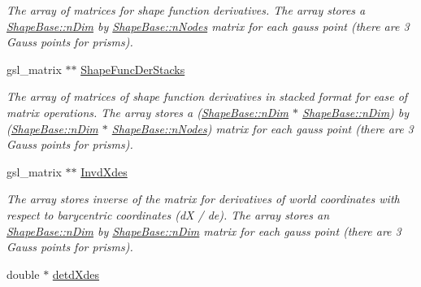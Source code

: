 \begin{DoxyCompactItemize}
\begin{DoxyCompactList}\small\item\em The array of matrices for shape function derivatives. The array stores a \hyperlink{classShapeBase_a250bd3396546342c8104f5b9c180d18f}{Shape\+Base\+::n\+Dim} by \hyperlink{classShapeBase_ae7dd93b58b3281ce90025f83d0f0e976}{Shape\+Base\+::n\+Nodes} matrix for each gauss point (there are 3 Gauss points for prisms). \end{DoxyCompactList}\item 
\hypertarget{classShapeBase_a23deaddf67b09f6fe5470f05385001fe}{}gsl\+\_\+matrix $\ast$$\ast$ \hyperlink{classShapeBase_a23deaddf67b09f6fe5470f05385001fe}{Shape\+Func\+Der\+Stacks}\label{classShapeBase_a23deaddf67b09f6fe5470f05385001fe}

\begin{DoxyCompactList}\small\item\em The array of matrices of shape function derivatives in stacked format for ease of matrix operations. The array stores a (\hyperlink{classShapeBase_a250bd3396546342c8104f5b9c180d18f}{Shape\+Base\+::n\+Dim} $\ast$ \hyperlink{classShapeBase_a250bd3396546342c8104f5b9c180d18f}{Shape\+Base\+::n\+Dim}) by (\hyperlink{classShapeBase_a250bd3396546342c8104f5b9c180d18f}{Shape\+Base\+::n\+Dim} $\ast$ \hyperlink{classShapeBase_ae7dd93b58b3281ce90025f83d0f0e976}{Shape\+Base\+::n\+Nodes}) matrix for each gauss point (there are 3 Gauss points for prisms). \end{DoxyCompactList}\item 
\hypertarget{classShapeBase_a4a5fc631abba61fa2488112a7a674377}{}gsl\+\_\+matrix $\ast$$\ast$ \hyperlink{classShapeBase_a4a5fc631abba61fa2488112a7a674377}{Invd\+Xdes}\label{classShapeBase_a4a5fc631abba61fa2488112a7a674377}

\begin{DoxyCompactList}\small\item\em The array stores inverse of the matrix for derivatives of world coordinates with respect to barycentric coordinates (d\+X / de). The array stores an \hyperlink{classShapeBase_a250bd3396546342c8104f5b9c180d18f}{Shape\+Base\+::n\+Dim} by \hyperlink{classShapeBase_a250bd3396546342c8104f5b9c180d18f}{Shape\+Base\+::n\+Dim} matrix for each gauss point (there are 3 Gauss points for prisms). \end{DoxyCompactList}\item 
\hypertarget{classShapeBase_ad1c2ef88314c7e567ca2bdcc6592f5ec}{}double $\ast$ \hyperlink{classShapeBase_ad1c2ef88314c7e567ca2bdcc6592f5ec}{detd\+Xdes}\label{classShapeBase_ad1c2ef88314c7e567ca2bdcc6592f5ec}


\end{DoxyCompactItemize}

